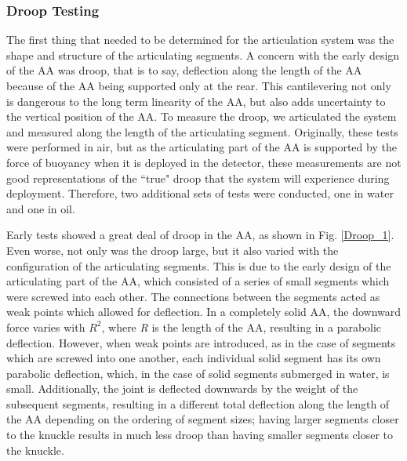 \subsubsection{Droop Testing}
  The first thing that needed to be determined for the articulation system was the shape and structure of the articulating segments. A concern with the early design of the AA was droop, that is to say, deflection along the length of the AA because of the AA being supported only at the rear. This cantilevering not only is dangerous to the long term linearity of the AA, but also adds uncertainty to the vertical position of the AA. To measure the droop, we articulated the system and measured along the length of the articulating segment.  Originally, these tests were performed in air, but as the articulating part of the AA is supported by the force of buoyancy when it is deployed in the detector, these measurements are not good representations of the ``true" droop that the system will experience during deployment. Therefore, two additional sets of tests were conducted, one in water and one in oil. 
  
  Early tests showed a great deal of droop in the AA, as shown in Fig. \ref{Droop_1}.  Even worse, not only was the droop large, but it also varied with the configuration of the articulating segments. This is due to the early design of the articulating part of the AA, which consisted of a series of small segments which were screwed into each other. The connections between the segments acted as weak points which allowed for deflection. In a completely solid AA, the downward force varies with $R^2$, where \emph{R} is the length of the AA, resulting in a parabolic deflection. However, when weak points are introduced, as in the case of segments which are screwed into one another, each individual solid segment has its own parabolic deflection, which, in the case of solid segments submerged in water, is small. Additionally, the joint is deflected downwards by the weight of the subsequent segments, resulting in a different total deflection along the length of the AA depending on the ordering of segment sizes; having larger segments closer to the knuckle results in much less droop than having smaller segments closer to the knuckle.  
  
